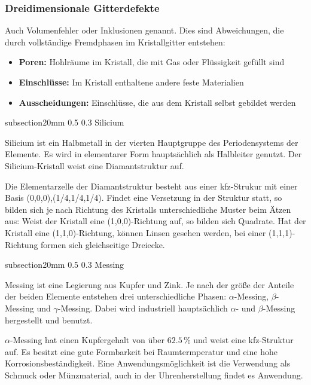 \documentclass[german, %
parskip=full, %
bibliography=totoc, %
]{scrartcl}
\makeatletter
\renewcommand\subsection{\@startsection 
   {subsection}{2}{0mm}%
   {0.5\baselineskip}%
   {0.3\baselineskip}%
   {\bfseries\sffamily\large}%
   }
\makeatother
\begin{document}
\subsubsection{Dreidimensionale Gitterdefekte}

Auch Volumenfehler oder Inklusionen genannt. Dies sind Abweichungen, die durch vollständige Fremdphasen im Kristallgitter entstehen:
\begin{itemize}
\item \textbf{Poren:} Hohlräume im Kristall, die mit Gas oder Flüssigkeit gefüllt sind
\item \textbf{Einschlüsse:} Im Kristall enthaltene andere feste Materialien
\item \textbf{Ausscheidungen:} Einschlüsse, die aus dem Kristall selbst gebildet werden
\end{itemize}

\subsection{Silicium}

Silicium ist ein Halbmetall in der vierten Hauptgruppe des Periodensystems der Elemente. Es wird in elementarer Form hauptsächlich als Halbleiter genutzt. Der Silicium-Kristall weist eine Diamantstruktur auf.

Die Elementarzelle der Diamantstruktur besteht aus einer kfz-Strukur mit einer Basis {(0,0,0),(1/4,1/4,1/4)}. Findet eine Versetzung in der Struktur statt, so bilden sich je nach Richtung des Kristalls unterschiedliche Muster beim Ätzen aus: Weist der Kristall eine (1,0,0)-Richtung auf, so bilden sich Quadrate. Hat der Kristall eine (1,1,0)-Richtung, können Linsen gesehen werden, bei einer (1,1,1)-Richtung formen sich gleichseitige Dreiecke.

\subsection{Messing}

Messing ist eine Legierung aus Kupfer und Zink. Je nach der größe der Anteile der beiden Elemente entstehen drei unterschiedliche Phasen: $\alpha$-Messing, $\beta$-Messing und $\gamma$-Messing. Dabei wird industriell hauptsächlich $\alpha$- und $\beta$-Messing hergestellt und benutzt.

$\alpha$-Messing hat einen Kupfergehalt von über $62.5\,\%$ und weist eine kfz-Struktur auf. Es besitzt eine gute Formbarkeit bei Raumtermperatur und eine hohe Korrosionsbeständigkeit. Eine Anwendungsmöglichkeit ist die Verwendung als Schmuck oder Münzmaterial, auch in der Uhrenherstellung findet es Anwendung. \cite{messing}
\end{document}
